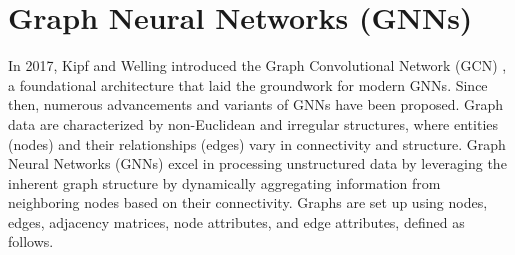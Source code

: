 \section{Graph Neural Networks (GNNs)} \label{gnnse}
In 2017, Kipf and Welling introduced the Graph Convolutional Network (GCN) \cite{kipf}, a foundational architecture that laid the groundwork for modern GNNs. Since then, numerous advancements and variants of GNNs have been proposed. Graph data are characterized by non-Euclidean and irregular structures, where entities (nodes) and their relationships (edges) vary in connectivity and structure. Graph Neural Networks (GNNs) excel in processing unstructured data by leveraging the inherent graph structure by dynamically aggregating information from neighboring nodes based on their connectivity. Graphs are set up using nodes, edges, adjacency matrices, node attributes, and edge attributes, defined as follows. 
